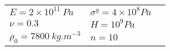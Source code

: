 \begin{tabular}{l|lN}
    \hline
    $E=2\times 10^{11}\:Pa$ & $\sigma^y=4 \times 10^8 Pa$ &\\ [3pt]
    $\nu=0.3$ & $H=10^{9} Pa$ & \\[3pt]
    $\rho_0 = 7800 \: kg.m^{-3}$ & $n= 10$& \\[3pt]
    \hline
\end{tabular}
